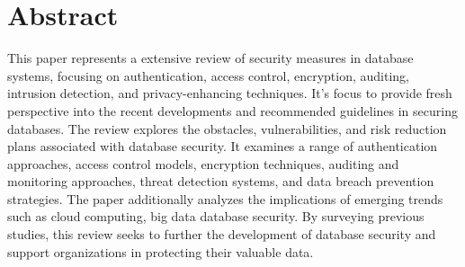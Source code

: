 \documentclass[12pt]{book} %
\begin{document}







{}












\setcounter{page}{1}




\section*{Abstract}

This paper represents a extensive review of security measures in database systems, focusing on authentication, access control, encryption, auditing, intrusion detection, and privacy-enhancing techniques. It's focus to provide fresh perspective into the recent developments and recommended guidelines in securing databases. The review  explores the obstacles, vulnerabilities, and risk reduction plans associated with 
database security. It examines a range of authentication approaches, access control models, encryption techniques, auditing and monitoring approaches, threat detection systems, and data breach prevention strategies. The paper additionally analyzes the implications of emerging trends such as cloud computing, big data database security. By surveying previous studies, this review seeks to further the development of database security and support organizations in protecting their valuable data.\cite{authentication_access_control_and_beyond} \label{sec:authentication_access_control_and_beyond_1}\\
\end{document}
